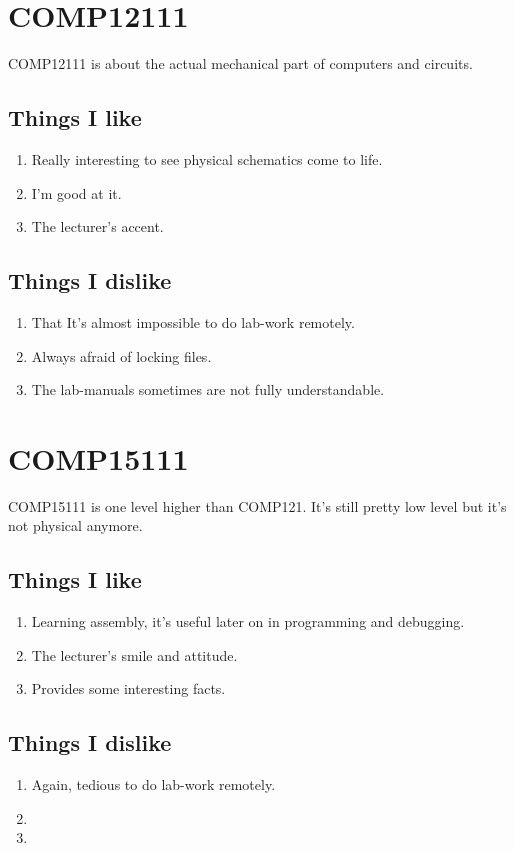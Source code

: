 \documentclass[a4paper]{article}
\begin{document}
\section{COMP12111}
COMP12111 is about the actual mechanical part of computers and circuits.
\subsection{Things I like}
\begin{enumerate}
\item{Really interesting to see physical schematics come to life.}
\item{I'm good at it.}
\item{The lecturer's accent.}
\end{enumerate}
\subsection{Things I dislike}
\begin{enumerate}
\item{That It's almost impossible to do lab-work remotely.}
\item{Always afraid of locking files.}
\item{The lab-manuals sometimes are not fully understandable.}
\end{enumerate}

\section{COMP15111}
COMP15111 is one level higher than COMP121. It's still pretty low level but it's not physical anymore.
\subsection{Things I like}
\begin{enumerate}
\item{Learning assembly, it's useful later on in programming and debugging.}
\item{The lecturer's smile and attitude.}
\item{Provides some interesting facts.}
\end{enumerate}
\subsection{Things I dislike}
\begin{enumerate}
\item{Again, tedious to do lab-work remotely.}
\item{}
\item{}
\end{enumerate}
\end{document}
